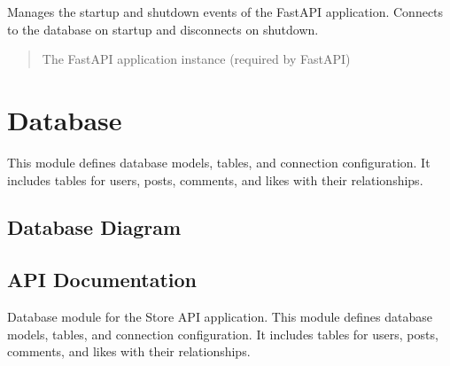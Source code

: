 \documentclass[letterpaper,10pt,openany,oneside,english]{sphinxmanual}
\begin{document}

\begin{savenotes}\begin{fulllineitems}
\label{\detokenize{modules/main:storeapi.main.lifespan}}
\pysigstartsignatures
{}
\pysigstopsignatures
\sphinxAtStartPar
Manages the startup and shutdown events of the FastAPI application.
Connects to the database on startup and disconnects on shutdown.
\begin{quote}\begin{description}
\sphinxAtStartPar
{} \textendash{} The FastAPI application instance (required by FastAPI)

\end{description}\end{quote}

\end{fulllineitems}\end{savenotes}


\sphinxstepscope


\chapter{Database}
\label{\detokenize{modules/database:database}}\label{\detokenize{modules/database::doc}}
\sphinxAtStartPar
This module defines database models, tables, and connection configuration.
It includes tables for users, posts, comments, and likes with their relationships.


\section{Database Diagram}
\label{\detokenize{modules/database:database-diagram}}


\section{API Documentation}
\label{\detokenize{modules/database:module-storeapi.database}}\label{\detokenize{modules/database:api-documentation}}
\sphinxAtStartPar
Database module for the Store API application.
This module defines database models, tables, and connection configuration.
It includes tables for users, posts, comments, and likes with their relationships.
\end{document}
